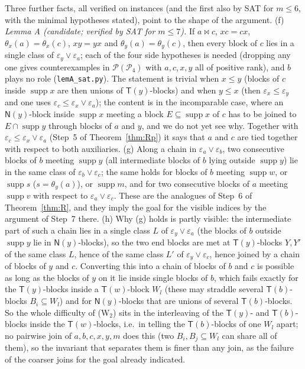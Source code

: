 \documentclass[11pt]{amsart}
\theoremstyle{definition}
\renewcommand{\P}{\mathcal{P}}
\newcommand{\supp}{\operatorname{supp}}
\newcommand{\T}{\mathsf{T}}
\newcommand{\N}{\mathsf{N}}
\newcommand{\mt}{\bowtie}   %
\begin{document}
Three further facts, all verified on instances (and the first also by SAT for $m\le6$, with the minimal hypotheses stated), point to the shape of the argument. (f) \emph{Lemma A (candidate; verified by SAT for $m\le7$).} If $a\mt c$, $xc=cx$, $\theta_x(a)=\theta_x(c)$, $xy=yx$ and $\theta_y(a)=\theta_y(c)$, then every block of $c$ lies in a single class of $\varepsilon_y\vee\varepsilon_a$; each of the four side hypotheses is needed (dropping any one gives counterexamples in $\P(\P_4)$ with $a,c,x,y$ all of positive rank), and $b$ plays no role (\texttt{lemA\_sat.py}). The statement is trivial when $x\le y$ (blocks of $c$ inside $\supp x$ are then unions of $\T(y)$-blocks) and when $y\le x$ (then $\varepsilon_x\le\varepsilon_y$ and one uses $\varepsilon_c\le\varepsilon_x\vee\varepsilon_a$); the content is in the incomparable case, where an $\N(y)$-block inside $\supp x$ meeting a block $E\subseteq\supp x$ of $c$ has to be joined to $E\cap\supp y$ through blocks of $a$ and $y$, and we do not yet see why. Together with $\varepsilon_c\le\varepsilon_x\vee\varepsilon_a$ (Step~5 of Theorem~\ref{thm:Rp}) it says that $a$ and $c$ are tied together with respect to both auxiliaries. (g) Along a chain in $\varepsilon_a\vee\varepsilon_b$, two consecutive blocks of $b$ meeting $\supp y$ (all intermediate blocks of $b$ lying outside $\supp y$) lie in the same class of $\varepsilon_b\vee\varepsilon_c$; the same holds for blocks of $b$ meeting $\supp w$, or $\supp s$ ($s=\theta_y(a)$), or $\supp m$, and for two consecutive blocks of $a$ meeting $\supp v$ with respect to $\varepsilon_a\vee\varepsilon_c$. These are the analogues of Step~6 of Theorem~\ref{thm:R}, and they imply the goal for the visible indices by the argument of Step~7 there. (h) Why (g) holds is partly visible: the intermediate part of such a chain lies in a single class $L$ of $\varepsilon_y\vee\varepsilon_a$ (the blocks of $b$ outside $\supp y$ lie in $\N(y)$-blocks), so the two end blocks are met at $\T(y)$-blocks $Y,Y'$ of the same class $L$, hence of the same class $L'$ of $\varepsilon_y\vee\varepsilon_c$, hence joined by a chain of blocks of $y$ and $c$. Converting this into a chain of blocks of $b$ and $c$ is possible as long as the blocks of $y$ on it lie inside single blocks of $b$, which fails exactly for the $\T(y)$-blocks inside a $\T(w)$-block $W_l$ (these may straddle several $\T(b)$-blocks $B_i\subseteq W_l$) and for $\N(y)$-blocks that are unions of several $\T(b)$-blocks. So the whole difficulty of (W$_2$) sits in the interleaving of the $\T(y)$- and $\T(b)$-blocks inside the $\T(w)$-blocks, i.e.\ in telling the $\T(b)$-blocks of one $W_l$ apart; no pairwise join of $a,b,c,x,y,m$ does this (two $B_i,B_j\subseteq W_l$ can share all of them), so the invariant that separates them is finer than any join, as the failure of the coarser joins for the goal already indicated.
\end{document}
